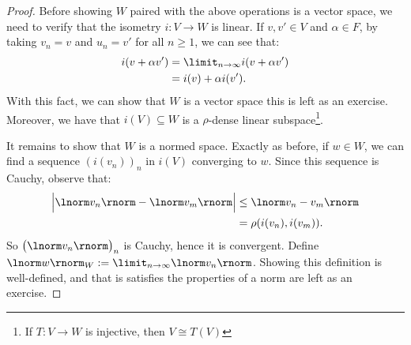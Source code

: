 \begin{proof}
            Before showing $W$ paired with the above operations is a vector space, we need to verify that the isometry $i:V \rightarrow W$ is linear. If $v,v' \in V$ and $\alpha \in F$, by taking $v_n = v$ and $u_n = v'$ for all $n\geq 1$, we can see that:
                \begin{equation*}
                \begin{split}
                    i(v + \alpha v')
                    & = \limit_{n \rightarrow \infty}i(v + \alpha v') \\
                    & = i(v) + \alpha i(v').
                \end{split}
                \end{equation*}
            With this fact, we can show that $W$ is a vector space \textemdash this is left as an exercise. Moreover, we have that $i(V) \subseteq W$ is a $\rho$-dense linear subspace\footnote{If $T:V \rightarrow W$ is injective, then $V \cong T(V)$}.

            It remains to show that $W$ is a normed space. Exactly as before, if $w \in W$, we can find a sequence $(i(v_n))_n$ in $i(V)$ converging to $w$. Since this sequence is Cauchy, observe that:
                \begin{equation*}
                \begin{split}
                    \Bigl| \lnorm v_n \rnorm - \lnorm v_m \rnorm \Bigr|
                    & \leq \lnorm v_n - v_m \rnorm \\
                    & = \rho(i(v_n),i(v_m)).
                \end{split}
                \end{equation*}
            So $\bigl(\lnorm v_n \rnorm\bigr)_n$ is Cauchy, hence it is convergent. Define $\lnorm w \rnorm_W := \limit_{n \rightarrow \infty} \lnorm v_n \rnorm$. Showing this definition is well-defined, and that is satisfies the properties of a norm are left as an exercise.
        \end{proof}

        \begin{center}
        \end{center}

